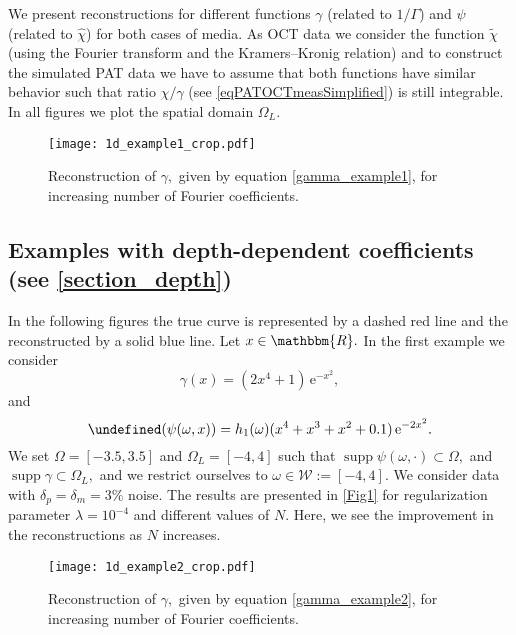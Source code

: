 \documentclass[a4paper,twoside,10pt]{article}
\theoremstyle{break}
\theoremstyle{nonumberplain}
\newcommand{\R}{\mathbbm{R}}
\newcommand{\e}{\mathrm e}
\let\IM\Im
\let\Im=\undefined
\DeclareMathOperator{\Im}{\IM m}
\DeclareMathOperator{\supp}{supp}
\begin{document}
We present reconstructions for different functions $\gamma$ (related to $1/\Gamma$) and $\psi$ (related to $\hat\chi$) for both cases of media. As OCT data we consider the function $\tilde \chi$ (using the Fourier transform and the Kramers--Kronig relation) and to construct the simulated PAT data we have to assume that both functions have similar behavior such that ratio $\hat\chi / \gamma$ (see \eqref{eqPATOCTmeasSimplified}) is still integrable. In all figures we plot the spatial domain $\Omega_L.$

\begin{figure}[t]
\begin{center}
\texttt{[image: 1d\_example1\_crop.pdf]}
\caption{Reconstruction of $\gamma,$ given by equation \eqref{gamma_example1}, for increasing number of Fourier coefficients.   }\label{Fig1}
\end{center}
\end{figure}

\subsection{Examples with depth-dependent coefficients (see \autoref{section_depth})}\label{section_depth_numerics}  
In the following figures the true curve is represented by a dashed red line and the reconstructed by a solid blue line.  Let $x\in\R.$ In the first example we consider 
\begin{equation}\label{gamma_example1}
\gamma (x) = (2x^4 + 1) \,\e^{-x^2},
\end{equation}
and
\[
\Im (\psi (\omega,x)) = h_1 (\omega) (x^4 + x^3 + x^2 + 0.1) \, \e^{-2x^2} .
\]
We set $\Omega = [-3.5,3.5]$ and $\Omega_L = [-4,4]$ such that 
$\supp \psi (\omega,\cdot ) \subset \Omega,$ and 
$\supp \gamma \subset \Omega_L,$  and we restrict ourselves to $\omega \in \mathcal{W}:= [-4,4].$ We consider data with $\delta_p = \delta_m = 3\%$ noise. The results are presented in \autoref{Fig1} for regularization parameter $\lambda = 10^{-4}$ and different values of $N.$ Here, we see the improvement in the reconstructions as $N$ increases.


\begin{figure}[t]
\begin{center}
\texttt{[image: 1d\_example2\_crop.pdf]}
\caption{Reconstruction of $\gamma,$ given by equation \eqref{gamma_example2}, for increasing number of Fourier coefficients.   }\label{Fig2}
\end{center}
\end{figure}
\end{document}
